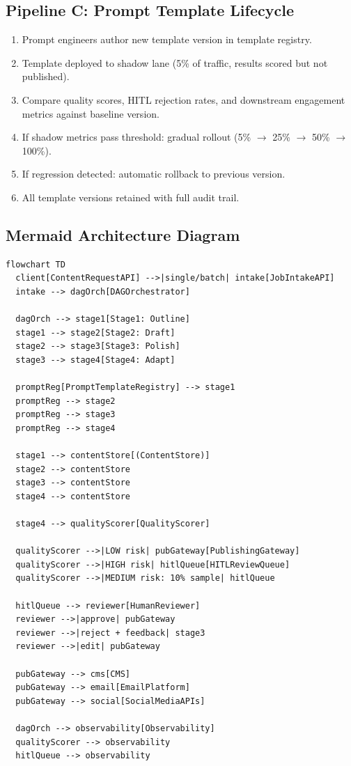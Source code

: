 \subsection*{Pipeline C: Prompt Template Lifecycle}

\begin{enumerate}
  \item Prompt engineers author new template version in template registry.
  \item Template deployed to shadow lane (5\% of traffic, results scored but not published).
  \item Compare quality scores, HITL rejection rates, and downstream engagement metrics against baseline version.
  \item If shadow metrics pass threshold: gradual rollout (5\% $\rightarrow$ 25\% $\rightarrow$ 50\% $\rightarrow$ 100\%).
  \item If regression detected: automatic rollback to previous version.
  \item All template versions retained with full audit trail.
\end{enumerate}

\subsection*{Mermaid Architecture Diagram}

\begin{verbatim}
flowchart TD
  client[ContentRequestAPI] -->|single/batch| intake[JobIntakeAPI]
  intake --> dagOrch[DAGOrchestrator]

  dagOrch --> stage1[Stage1: Outline]
  stage1 --> stage2[Stage2: Draft]
  stage2 --> stage3[Stage3: Polish]
  stage3 --> stage4[Stage4: Adapt]

  promptReg[PromptTemplateRegistry] --> stage1
  promptReg --> stage2
  promptReg --> stage3
  promptReg --> stage4

  stage1 --> contentStore[(ContentStore)]
  stage2 --> contentStore
  stage3 --> contentStore
  stage4 --> contentStore

  stage4 --> qualityScorer[QualityScorer]

  qualityScorer -->|LOW risk| pubGateway[PublishingGateway]
  qualityScorer -->|HIGH risk| hitlQueue[HITLReviewQueue]
  qualityScorer -->|MEDIUM risk: 10% sample| hitlQueue

  hitlQueue --> reviewer[HumanReviewer]
  reviewer -->|approve| pubGateway
  reviewer -->|reject + feedback| stage3
  reviewer -->|edit| pubGateway

  pubGateway --> cms[CMS]
  pubGateway --> email[EmailPlatform]
  pubGateway --> social[SocialMediaAPIs]

  dagOrch --> observability[Observability]
  qualityScorer --> observability
  hitlQueue --> observability
\end{verbatim}

